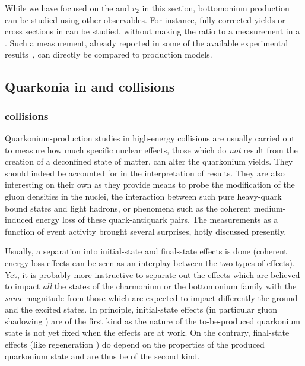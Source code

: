 \documentclass[../report.tex]{subfiles}
\begin{document}
While we have focused on the \raa and $v_2$ in this section, bottomonium production can be studied using other observables. For instance, fully corrected yields or cross sections
in \PbPb can be studied, without making the ratio to a \pp measurement in a \raa. Such a measurement, already reported in some of the available experimental results~\cite{Sirunyan:2018nsz},
can directly be compared to production models. 



\subsection{Quarkonia in \pPb and \pp collisions}%

\subsubsection{\pPb collisions} %
Quarkonium-production studies in high-energy \pPb collisions are usually carried out to measure how much specific nuclear effects, those which do {\it not} result from the creation of a deconfined state of matter, can alter the quarkonium yields. They should indeed be accounted for in the interpretation of \PbPb  results. They are also interesting on their own as they provide means to probe the modification of the gluon densities in the nuclei, the interaction between such pure heavy-quark bound states and light hadrons, or phenomena such as the coherent medium-induced energy loss of these quark-antiquark pairs.
The measurements as a function of event activity 
brought several surprises, hotly discussed presently.
 
Usually, a separation into initial-state and final-state effects is done (coherent energy loss effects \cite{Arleo:2010rb} can be seen as an interplay between the two types of effects). Yet, it is probably more instructive to separate out the effects which are believed to impact {\it all} the states of the charmonium or the bottomonium family with the {\it same} magnitude
 from those which are expected to impact differently the ground and the excited states. In principle, initial-state effects (in particular gluon shadowing \cite{Kusina:2017gkz}) are of the first kind as the nature of the to-be-produced quarkonium state is not yet fixed when the effects are at work.  On the contrary, final-state effects (like regeneration \cite{Du:2018wsj}) do depend on the properties of the produced quarkonium state and are thus be of the second kind.
 
\end{document}
